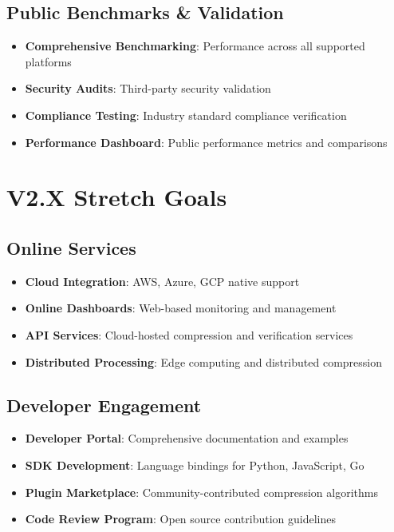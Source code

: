 \documentclass[12pt,a4paper]{article}
\begin{document}
\subsection{Public Benchmarks \& Validation}
\begin{itemize}
    \item \textbf{Comprehensive Benchmarking}: Performance across all supported platforms
    \item \textbf{Security Audits}: Third-party security validation
    \item \textbf{Compliance Testing}: Industry standard compliance verification
    \item \textbf{Performance Dashboard}: Public performance metrics and comparisons
\end{itemize}

\section{V2.X Stretch Goals}

\subsection{Online Services}
\begin{itemize}
    \item \textbf{Cloud Integration}: AWS, Azure, GCP native support
    \item \textbf{Online Dashboards}: Web-based monitoring and management
    \item \textbf{API Services}: Cloud-hosted compression and verification services
    \item \textbf{Distributed Processing}: Edge computing and distributed compression
\end{itemize}

\subsection{Developer Engagement}
\begin{itemize}
    \item \textbf{Developer Portal}: Comprehensive documentation and examples
    \item \textbf{SDK Development}: Language bindings for Python, JavaScript, Go
    \item \textbf{Plugin Marketplace}: Community-contributed compression algorithms
    \item \textbf{Code Review Program}: Open source contribution guidelines
\end{itemize}
\end{document}
